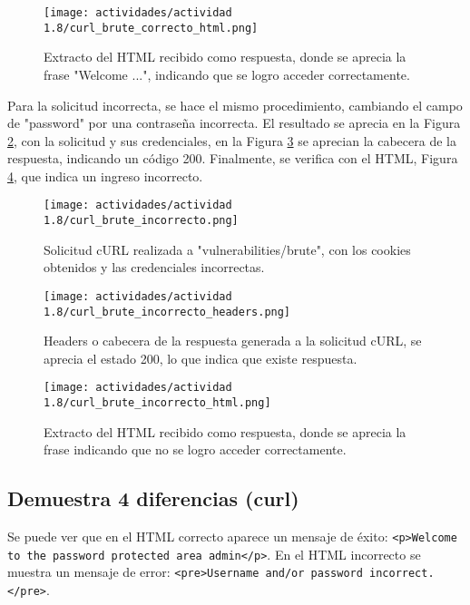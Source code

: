 \documentclass[letter,12pt]{article}
\begin{document}
\begin{figure}[H]
    \centering
    \texttt{[image: actividades/actividad 1.8/curl\_brute\_correcto\_html.png]}
    \caption{Extracto del HTML recibido como respuesta, donde se aprecia la frase "Welcome ...", indicando que se logro acceder correctamente.}
    \label{actividad 1.8 curl_brute_correcto_html}
\end{figure}

Para la solicitud incorrecta, se hace el mismo procedimiento, cambiando el campo de "password" por una contraseña incorrecta. El resultado se aprecia en la Figura \ref{actividad 1.8 curl_brute_incorrecto}, con la solicitud y sus credenciales, en la Figura \ref{actividad 1.8 curl_brute_incorrecto_headers} se aprecian la cabecera de la respuesta, indicando un código 200. Finalmente, se verifica con el HTML, Figura \ref{actividad 1.8 curl_brute_incorrecto_html}, que indica un ingreso incorrecto.

\begin{figure}[H]
    \centering
    \texttt{[image: actividades/actividad 1.8/curl\_brute\_incorrecto.png]}
    \caption{Solicitud cURL realizada a "vulnerabilities/brute", con los cookies obtenidos y las credenciales incorrectas.}
    \label{actividad 1.8 curl_brute_incorrecto}
\end{figure}

\begin{figure}[H]
    \centering
    \texttt{[image: actividades/actividad 1.8/curl\_brute\_incorrecto\_headers.png]}
    \caption{Headers o cabecera de la respuesta generada a la solicitud cURL, se aprecia el estado 200, lo que indica que existe respuesta.}
    \label{actividad 1.8 curl_brute_incorrecto_headers}
\end{figure}

\begin{figure}[H]
    \centering
    \texttt{[image: actividades/actividad 1.8/curl\_brute\_incorrecto\_html.png]}
    \caption{Extracto del HTML recibido como respuesta, donde se aprecia la frase indicando que no se logro acceder correctamente.}
    \label{actividad 1.8 curl_brute_incorrecto_html}
\end{figure}


\subsection{Demuestra 4 diferencias (curl)}
Se puede ver que en el HTML correcto aparece un mensaje de éxito: \texttt{<p>Welcome to the password protected area admin</p>}. En el HTML incorrecto se muestra un mensaje de error: \texttt{<pre>Username and/or password incorrect.</pre>}.
\end{document}
